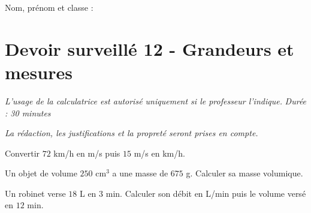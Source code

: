 \documentclass[a4paper,10pt]{report}
\begin{document}
\pagestyle{empty}
\noindent Nom, prénom et classe : \dotfill

\section*{Devoir surveillé 12 - Grandeurs et mesures}

\noindent \textit{L'usage de la calculatrice est autorisé uniquement si le professeur l'indique.} \hfill \textit{Durée : 30 minutes}

\medskip
\noindent \textit{La rédaction, les justifications et la propreté seront prises en compte.}


\begin{ex}[Vitesse]
Convertir $72$ km/h en m/s puis $15$ m/s en km/h.
\medskip\noindent\grandscarreaux{\linewidth}{4cm}
\end{ex}
\begin{ex}
Un objet de volume $250$ cm$^3$ a une masse de $675$ g. Calculer sa masse volumique.
\medskip\noindent\grandscarreaux{\linewidth}{3cm}
\end{ex}
\begin{ex}[Débit]
Un robinet verse $18$ L en $3$ min. Calculer son débit en L/min puis le volume versé en $12$ min.
\medskip\noindent\grandscarreaux{\linewidth}{4cm}
\end{ex}
\end{document}
